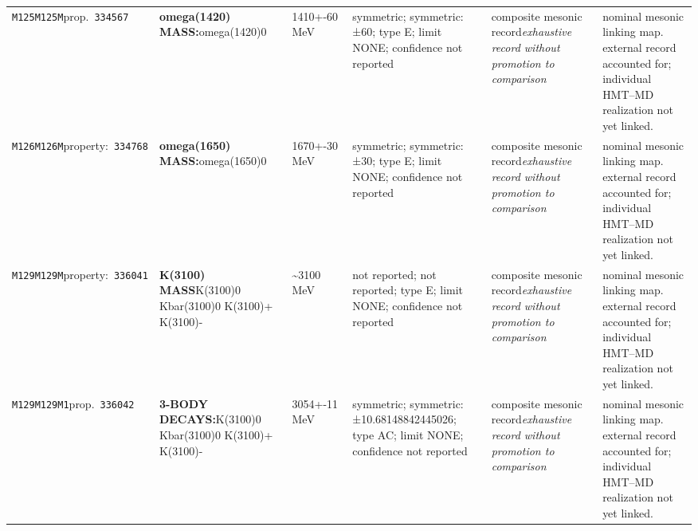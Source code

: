 \begin{landscape}
\begin{longtable}{L{1.85cm}L{4.45cm}L{2.35cm}L{4.05cm}L{3.35cm}L{7.15cm}}
\texttt{M125}\newline \texttt{M125M}\newline prop.\ \texttt{334567} & \textbf{omega(1420) MASS:}\newline omega(1420)0 & 1410+-60\,MeV & symmetric; symmetric: ±60; type E; limit NONE; confidence not reported & composite mesonic record\newline \emph{exhaustive record without promotion to comparison} & nominal mesonic linking map. external record accounted for; individual HMT--MD realization not yet linked. \\
\texttt{M126}\newline \texttt{M126M}\newline property:\ \texttt{334768} & \textbf{omega(1650) MASS:}\newline omega(1650)0 & 1670+-30\,MeV & symmetric; symmetric: ±30; type E; limit NONE; confidence not reported & composite mesonic record\newline \emph{exhaustive record without promotion to comparison} & nominal mesonic linking map. external record accounted for; individual HMT--MD realization not yet linked. \\
\texttt{M129}\newline \texttt{M129M}\newline property:\ \texttt{336041} & \textbf{K(3100) MASS}\newline K(3100)0 \textbar{}\allowbreak{} Kbar(3100)0 \textbar{}\allowbreak{} K(3100)+ \textbar{}\allowbreak{} K(3100)- & \textasciitilde{}3100\,MeV & not reported; not reported; type E; limit NONE; confidence not reported & composite mesonic record\newline \emph{exhaustive record without promotion to comparison} & nominal mesonic linking map. external record accounted for; individual HMT--MD realization not yet linked. \\
\texttt{M129}\newline \texttt{M129M1}\newline prop.\ \texttt{336042} & \textbf{3-BODY DECAYS:}\newline K(3100)0 \textbar{}\allowbreak{} Kbar(3100)0 \textbar{}\allowbreak{} K(3100)+ \textbar{}\allowbreak{} K(3100)- & 3054+-11\,MeV & symmetric; symmetric: ±10.68148842445026; type AC; limit NONE; confidence not reported & composite mesonic record\newline \emph{exhaustive record without promotion to comparison} & nominal mesonic linking map. external record accounted for; individual HMT--MD realization not yet linked. \\

\end{longtable}
\end{landscape}
